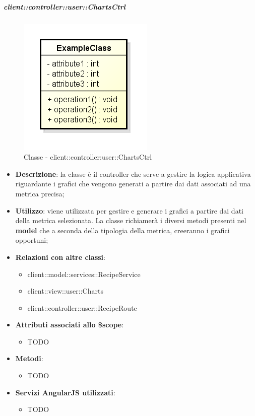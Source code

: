 		\subparagraph{client::controller::user::ChartsCtrl} %
		\label{subp:client_controller_user_chartsctrl}
			\begin{figure}[htbp]
				\centering
				\centerline{\includegraphics[scale=0.7]{./images/client/classes/example_class.png}}
				\caption{Classe - client::controller:user::ChartsCtrl}
			\end{figure}
			\begin{itemize}
				\item \textbf{Descrizione}: la classe è il controller che serve a gestire la logica applicativa riguardante i grafici che vengono generati a partire dai dati associati ad una metrica precisa;
				\item \textbf{Utilizzo}: viene utilizzata per gestire e generare i grafici a partire dai dati della metrica selezionata. La classe richiamerà i diversi metodi presenti nel \textbf{model} che a seconda della tipologia della metrica, creeranno i grafici opportuni;
				\item \textbf{Relazioni con altre classi}:
					\begin{itemize}
						\item client::model::services::RecipeService
						\item client::view::user::Charts
						\item client::controller::user::RecipeRoute
					\end{itemize}

				\item \textbf{Attributi associati allo \$scope}:
					\begin{itemize}
						\item TODO
					\end{itemize}

				\item \textbf{Metodi}:
					\begin{itemize}
						\item TODO
					\end{itemize}

				\item \textbf{Servizi AngularJS utilizzati}:
					\begin{itemize}
						\item TODO
					\end{itemize}

			\end{itemize}

